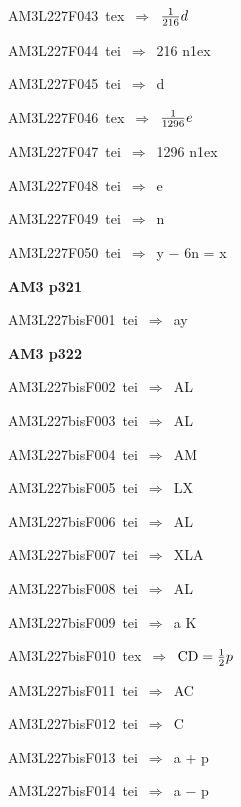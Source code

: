 {\sixrm AM3L227F043\ {\sixit tex}\ }$\Rightarrow$\ ${1\over 216} d$\par\smallskip
{\sixrm AM3L227F044\ {\sixit tei}\ }$\Rightarrow$\ 216 {\tenit n}\raise1ex\hbox{}\par\smallskip
{\sixrm AM3L227F045\ {\sixit tei}\ }$\Rightarrow$\ {\tenit d}\par\smallskip
{\sixrm AM3L227F046\ {\sixit tex}\ }$\Rightarrow$\ ${1\over 1296} e$\par\smallskip
{\sixrm AM3L227F047\ {\sixit tei}\ }$\Rightarrow$\ 1296 {\tenit n}\raise1ex\hbox{}\par\smallskip
{\sixrm AM3L227F048\ {\sixit tei}\ }$\Rightarrow$\ {\tenit e}\par\smallskip
{\sixrm AM3L227F049\ {\sixit tei}\ }$\Rightarrow$\ {\tenit n}\par\smallskip
{\sixrm AM3L227F050\ {\sixit tei}\ }$\Rightarrow$\ {\tenit y} − 6{\tenit n} = {\tenit x}\par\smallskip

\par\vfill\eject
{\bf\hfill AM3 p321\hfill\hbox{}}\par\bigskip
{\sixrm AM3L227bisF001\ {\sixit tei}\ }$\Rightarrow$\ ay\par\smallskip

\par\vfill\eject
{\bf\hfill AM3 p322\hfill\hbox{}}\par\bigskip
{\sixrm AM3L227bisF002\ {\sixit tei}\ }$\Rightarrow$\ AL\par\smallskip
{\sixrm AM3L227bisF003\ {\sixit tei}\ }$\Rightarrow$\ AL\par\smallskip
{\sixrm AM3L227bisF004\ {\sixit tei}\ }$\Rightarrow$\ AM\par\smallskip
{\sixrm AM3L227bisF005\ {\sixit tei}\ }$\Rightarrow$\ LX\par\smallskip
{\sixrm AM3L227bisF006\ {\sixit tei}\ }$\Rightarrow$\ AL\par\smallskip
{\sixrm AM3L227bisF007\ {\sixit tei}\ }$\Rightarrow$\ XLA\par\smallskip
{\sixrm AM3L227bisF008\ {\sixit tei}\ }$\Rightarrow$\ AL\par\smallskip
{\sixrm AM3L227bisF009\ {\sixit tei}\ }$\Rightarrow$\ {\tenit a} K\par\smallskip
{\sixrm AM3L227bisF010\ {\sixit tex}\ }$\Rightarrow$\ ${\rm CD} = {{1\over 2}}p$\par\smallskip
{\sixrm AM3L227bisF011\ {\sixit tei}\ }$\Rightarrow$\ AC\par\smallskip
{\sixrm AM3L227bisF012\ {\sixit tei}\ }$\Rightarrow$\ C\par\smallskip
{\sixrm AM3L227bisF013\ {\sixit tei}\ }$\Rightarrow$\ a + {\tenit p}\par\smallskip
{\sixrm AM3L227bisF014\ {\sixit tei}\ }$\Rightarrow$\ a − {\tenit p}\par\smallskip

